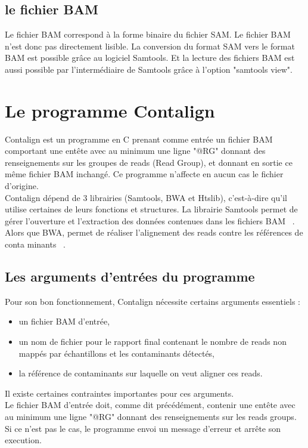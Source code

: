 \documentclass[a4paper,12pt]{article}
\begin{document}
\subsection{le fichier BAM}
Le fichier BAM correspond à la forme binaire du fichier SAM. Le fichier BAM n'est donc pas directement lisible. La conversion du format SAM vers le format BAM est possible grâce au logiciel Samtools. Et la lecture des fichiers BAM est aussi possible par l'intermédiaire de Samtools grâce à l'option "samtools view". 
 \\
\section{Le programme Contalign}

Contalign est un programme en C prenant comme entrée un fichier BAM comportant une entête avec au minimum une ligne "@RG" donnant des renseignements sur les groupes de reads (Read Group), et donnant en sortie ce même fichier BAM inchangé. Ce programme n'affecte en aucun cas le fichier d'origine.  \\
Contalign dépend de 3 librairies (Samtools, BWA et Htslib), c'est-à-dire qu'il utilise certaines de leurs fonctions et structures. La librairie Samtools permet de gérer l'ouverture et l'extraction des données contenues dans les fichiers BAM ~\cite{SAM2}. Alors que BWA, permet de réaliser l'alignement des reads contre les références de conta minants ~\cite{BWA}. 
\\
\subsection{Les arguments d'entrées du programme}

Pour son bon fonctionnement, Contalign nécessite certains arguments essentiels : 
\begin{itemize}
\item un fichier BAM d'entrée, 
\item un nom de fichier pour le rapport final contenant le nombre de reads non mappés par échantillons et les contaminants détectés, 
\item la référence de contaminants sur laquelle on veut aligner ces reads.
\end{itemize}
Il existe certaines contraintes importantes pour ces arguments. \\

Le fichier BAM d'entrée doit, comme dit précédément, contenir une entête avec au minimum une ligne "@RG" donnant des renseignements sur les reads groups. Si ce n'est pas le cas, le programme envoi un message d'erreur et arrête son execution. \\
\end{document}
